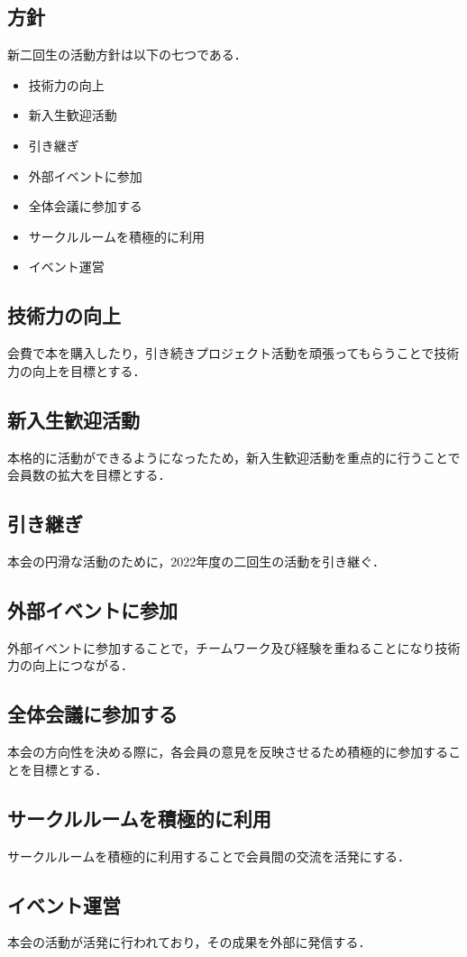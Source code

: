 \subsection*{\newGradeIfKouki{}\secondGrade{}方針}


新二回生の活動方針は以下の七つである．

\begin{itemize}
    \item 技術力の向上
    \item 新入生歓迎活動   
    \item 引き継ぎ
    \item 外部イベントに参加
    \item 全体会議に参加する
    \item サークルルームを積極的に利用
    \item イベント運営
\end{itemize}

\subsection*{技術力の向上}
会費で本を購入したり，引き続きプロジェクト活動を頑張ってもらうことで技術力の向上を目標とする．

\subsection*{新入生歓迎活動}
本格的に活動ができるようになったため，新入生歓迎活動を重点的に行うことで会員数の拡大を目標とする．

\subsection*{引き継ぎ}
本会の円滑な活動のために，2022年度の二回生の活動を引き継ぐ．

\subsection*{外部イベントに参加}
外部イベントに参加することで，チームワーク及び経験を重ねることになり技術力の向上につながる．

\subsection*{全体会議に参加する}
本会の方向性を決める際に，各会員の意見を反映させるため積極的に参加することを目標とする．

\subsection*{サークルルームを積極的に利用}
サークルルームを積極的に利用することで会員間の交流を活発にする．

\subsection*{イベント運営}
本会の活動が活発に行われており，その成果を外部に発信する．
